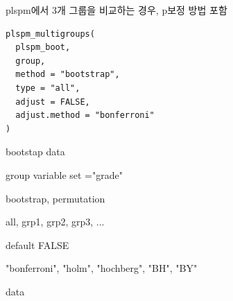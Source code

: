 \documentclass[a4paper]{book}
\begin{document}
%
\begin{Description}
plspm에서 3개 그룹을 비교하는 경우, p보정 방법 포함
\end{Description}
%
\begin{Usage}
\begin{verbatim}
plspm_multigroups(
  plspm_boot,
  group,
  method = "bootstrap",
  type = "all",
  adjust = FALSE,
  adjust.method = "bonferroni"
)
\end{verbatim}
\end{Usage}
%
\begin{Arguments}
\begin{ldescription}
\item[\code{plspm\_boot}] bootstap data

\item[\code{group}] group variable set ="grade"

\item[\code{method}] bootstrap, permutation

\item[\code{type}] all, grp1, grp2, grp3, ...

\item[\code{adjust}] default FALSE

\item[\code{adjust.method}] "bonferroni", "holm", "hochberg", "BH", "BY"
\end{ldescription}
\end{Arguments}
%
\begin{Value}
data
\end{Value}
%
\end{document}
